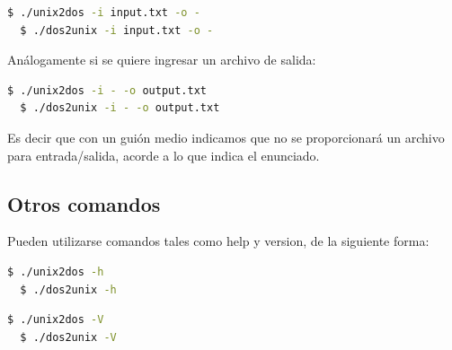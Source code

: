 \documentclass[a4paper]{article}
\begin{document}
\begin{lstlisting}[language=bash]
  $ ./unix2dos -i input.txt -o -
  $ ./dos2unix -i input.txt -o -
\end{lstlisting}

Análogamente si se quiere ingresar un archivo de salida:

\begin{lstlisting}[language=bash]
  $ ./unix2dos -i - -o output.txt
  $ ./dos2unix -i - -o output.txt
\end{lstlisting}

Es decir que con un guión medio indicamos que no se proporcionará un archivo para entrada/salida, acorde a lo que indica el enunciado.

\subsection{Otros comandos}

Pueden utilizarse comandos tales como help y version, de la siguiente forma:

\begin{lstlisting}[language=bash]
  $ ./unix2dos -h
  $ ./dos2unix -h
\end{lstlisting}

\begin{lstlisting}[language=bash]
  $ ./unix2dos -V
  $ ./dos2unix -V
\end{lstlisting}
\end{document}
